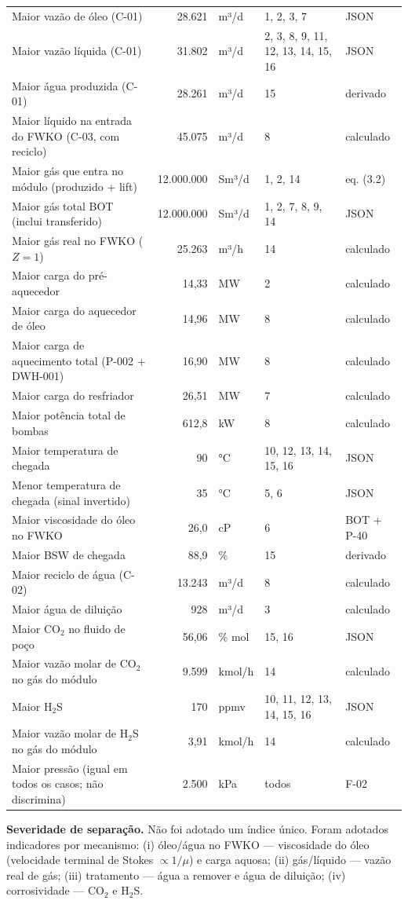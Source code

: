 \documentclass[11pt,a4paper]{article}
\numberwithin{equation}{section}
\numberwithin{table}{section}
\numberwithin{figure}{section}
\begin{document}
\begin{longtable}{L{6.4cm}rlL{2.2cm}L{3.2cm}}
Maior vazão de óleo (C-01) & 28.621 & m³/d & 1, 2, 3, 7 & JSON\\
Maior vazão líquida (C-01) & 31.802 & m³/d & 2, 3, 8, 9, 11, 12, 13, 14, 15, 16 & JSON\\
Maior água produzida (C-01) & 28.261 & m³/d & 15 & derivado\\
Maior líquido na entrada do FWKO (C-03, com reciclo) & 45.075 & m³/d & 8 & calculado\\
Maior gás que entra no módulo (produzido + lift) & 12.000.000 & Sm³/d & 1, 2, 14 & eq. (3.2)\\
Maior gás total BOT (inclui transferido) & 12.000.000 & Sm³/d & 1, 2, 7, 8, 9, 14 & JSON\\
Maior gás real no FWKO ($Z=1$) & 25.263 & m³/h & 14 & calculado\\
Maior carga do pré-aquecedor & 14,33 & MW & 2 & calculado\\
Maior carga do aquecedor de óleo & 14,96 & MW & 8 & calculado\\
Maior carga de aquecimento total (P-002 + DWH-001) & 16,90 & MW & 8 & calculado\\
Maior carga do resfriador & 26,51 & MW & 7 & calculado\\
Maior potência total de bombas & 612,8 & kW & 8 & calculado\\
Maior temperatura de chegada & 90 & °C & 10, 12, 13, 14, 15, 16 & JSON\\
Menor temperatura de chegada (sinal invertido) & 35 & °C & 5, 6 & JSON\\
Maior viscosidade do óleo no FWKO & 26,0 & cP & 6 & BOT + P-40\\
Maior BSW de chegada & 88,9 & \% & 15 & derivado\\
Maior reciclo de água (C-02) & 13.243 & m³/d & 8 & calculado\\
Maior água de diluição & 928 & m³/d & 3 & calculado\\
Maior CO$_2$ no fluido de poço & 56,06 & \% mol & 15, 16 & JSON\\
Maior vazão molar de CO$_2$ no gás do módulo & 9.599 & kmol/h & 14 & calculado\\
Maior H$_2$S & 170 & ppmv & 10, 11, 12, 13, 14, 15, 16 & JSON\\
Maior vazão molar de H$_2$S no gás do módulo & 3,91 & kmol/h & 14 & calculado\\
\midrule
Maior pressão (igual em todos os casos; não discrimina) & 2.500 & kPa & todos & F-02\\
\bottomrule\end{longtable}
\textbf{Severidade de separação.} Não foi adotado um índice único. Foram adotados indicadores por mecanismo: (i) óleo/água no FWKO --- viscosidade do óleo (velocidade terminal de Stokes $\propto1/\mu$) e carga aquosa; (ii) gás/líquido --- vazão real de gás; (iii) tratamento --- água a remover e água de diluição; (iv) corrosividade --- CO$_2$ e H$_2$S.
\end{document}
